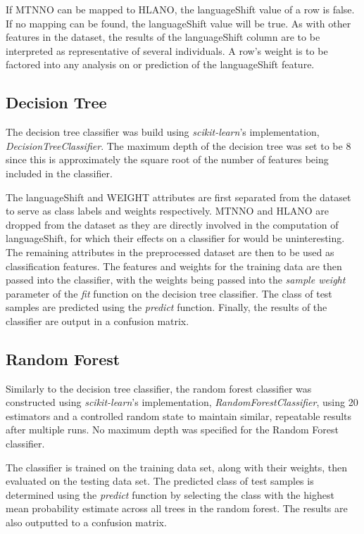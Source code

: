 \documentclass[10pt, conference, compsocconf]{IEEEtran}
\begin{document}
If MTNNO can be mapped to HLANO, the languageShift value of a row is false.  If no mapping can be found, the languageShift value will be true.  As with other features in the dataset, the results of the languageShift column are to be interpreted as representative of several individuals.  A row's weight is to be factored into any analysis on or prediction of the languageShift feature.


\subsection{Decision Tree}
The decision tree classifier was build using \textit{scikit-learn}'s implementation, \textit{DecisionTreeClassifier}. The maximum depth of the decision tree was set to be 8 since this is approximately the square root of the number of features being included in the classifier.

The languageShift and WEIGHT attributes are first separated from the dataset to serve as class labels and weights respectively.  MTNNO and HLANO are dropped from the dataset as they are directly involved in the computation of languageShift, for which their effects on a classifier for would be uninteresting.  The remaining attributes in the preprocessed dataset are then to be used as classification features. The features and weights for the training data are then passed into the classifier, with the weights being passed into the \textit{sample weight} parameter of the \textit{fit} function on the decision tree classifier. The class of test samples are predicted using the \textit{predict} function. Finally, the results of the classifier are output in a confusion matrix.

\subsection{Random Forest}

Similarly to the decision tree classifier, the random forest classifier was constructed using \textit{scikit-learn}'s implementation, \textit{RandomForestClassifier}, using 20 estimators and a controlled random state to maintain similar, repeatable results after multiple runs. No maximum depth was specified for the Random Forest classifier.

The classifier is trained on the training data set, along with their weights, then evaluated on the testing data set. The predicted class of test samples is determined using the \textit{predict} function by selecting the class with the highest mean probability estimate across all trees in the random forest. The results are also outputted to a confusion matrix.
\end{document}
